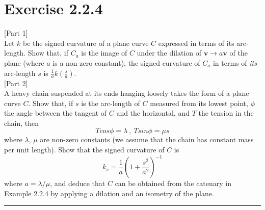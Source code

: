\documentclass[12pt]{article}
\begin{document}
\maketitle

\section*{Exercise 2.2.4}
[Part 1]\\
Let $k$ be the signed curvature of a plane curve $C$ expressed in terms of  its arc-length. Show that, if $C_a$ is the image of $C$ under the dilation of $\textbf{v} \rightarrow a\textbf{v}$ of the plane (where $a$ is a non-zero constant), the signed curvature of $C_a$ in terms of \textit{its} arc-length $s$ is $\frac{1}{a}k(\frac{s}{a})$.\\

[Part 2]\\
A heavy chain suspended at its ends hanging loosely takes the form of a plane curve $C$. Show that, if $s$ is the arc-length of $C$ measured from its lowest point, $\phi$ the angle between the tangent of $C$ and the horizontal, and $T$ the tension in the chain, then
$$ Tcos\phi = \lambda \ , \ Tsin\phi = \mu s $$
where $\lambda$, $\mu$ are non-zero constants (we assume that the chain has constant mass per unit length). Show that the signed curvature of $C$ is 
$$ k_s = \frac{1}{a}\left(1+\frac{s^2}{a^2}\right)^{-1}$$
where $a=\lambda/\mu$, and deduce that $C$ can be obtained from the catenary in Example 2.2.4 by applying a dilation and an isometry of the plane.

\vspace{1cm}
\hrule
\vspace{1cm}
\end{document}

